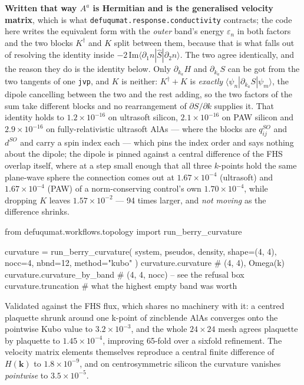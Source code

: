\documentclass[11pt,a4paper]{article}
\newcommand{\code}[1]{\texttt{\small #1}}
\begin{document}
\textbf{Written that way $A^a$ is Hermitian and is the generalised velocity
matrix}, which is what \code{defuqumat.response.conductivity} contracts; the code
here writes the equivalent form with the \emph{outer} band's energy
$\varepsilon_n$ in both factors and the two blocks $K^\dagger$ and $K$ split
between them, because that is what falls out of resolving the identity inside
$-2\,\mathrm{Im}\langle\partial_1 n|\hat S|\partial_2 n\rangle$. The two agree
identically, and the reason they do is the identity below. Only
$\partial_{k_a}H$ and $\partial_{k_a}S$ can be got from
the two tangents of one \code{jvp}, and $K$ is neither: $K^\dagger + K$ is
\emph{exactly} $\langle\psi_n|\partial_{k_a}S|\psi_m\rangle$, the dipole
cancelling between the two and the rest adding, so the two factors of the sum
take different blocks and no rearrangement of $\partial S/\partial k$ supplies
it. That identity holds to $1.2\times10^{-16}$ on ultrasoft silicon,
$2.1\times10^{-16}$ on PAW silicon and $2.9\times10^{-16}$ on
fully-relativistic ultrasoft AlAs --- where the blocks are $q^{SO}_{ij}$ and
$d^{SO}$ and carry a spin index each --- which pins the index order and says
nothing about the dipole; the dipole is pinned against a central difference of the FHS
overlap itself, where at a step small enough that all three $k$-points hold the
same plane-wave sphere the connection comes out at
$1.67\times10^{-4}$ (ultrasoft) and $1.67\times10^{-4}$ (PAW) of a
norm-conserving control's own $1.70\times10^{-4}$, while dropping $K$ leaves
$1.57\times10^{-2}$ --- 94 times larger, and \emph{not moving} as the difference
shrinks.

\begin{pycode}
from defuqumat.workflows.topology import run_berry_curvature

curvature = run_berry_curvature(
    system, pseudos, density, shape=(4, 4), nocc=4, nbnd=12, method="kubo"
)
curvature.curvature          # (4, 4), Omega(k)
curvature.curvature_by_band  # (4, 4, nocc) -- see the refusal box
curvature.truncation         # what the highest empty band was worth
\end{pycode}

Validated against the FHS flux, which shares no machinery with it: a centred
plaquette shrunk around one k-point of zincblende AlAs converges onto the
pointwise Kubo value to $3.2\times10^{-3}$, and the whole $24\times24$ mesh
agrees plaquette by plaquette to $1.45\times10^{-4}$, improving 65-fold over a
sixfold refinement. The velocity matrix elements themselves reproduce a central
finite difference of $H(\mathbf k)$ to $1.8\times10^{-9}$, and on centrosymmetric
silicon the curvature vanishes \emph{pointwise} to $3.5\times10^{-5}$.
\end{document}

